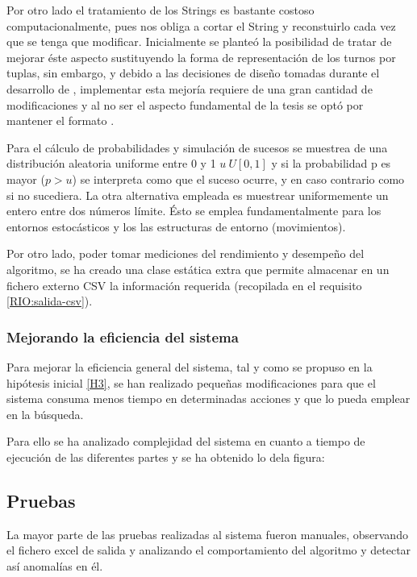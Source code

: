 Por otro lado el tratamiento de los Strings es bastante costoso computacionalmente, pues nos obliga a cortar el String y reconstuirlo cada vez que se tenga que modificar. Inicialmente se planteó la posibilidad de tratar de mejorar éste aspecto sustituyendo la forma de representación de los turnos por tuplas, sin embargo, y debido a las decisiones de diseño tomadas durante el desarrollo de \legacy{}, implementar esta mejoría requiere de una gran cantidad de modificaciones y al no ser el aspecto fundamental de la tesis se optó por mantener el formato \legacy{}.

Para el cálculo de probabilidades y simulación de sucesos se muestrea de una distribución aleatoria uniforme entre 0 y 1 $u ~ U[0,1]$ y si la probabilidad p es mayor ($p>u$) se interpreta como que el suceso ocurre, y en caso contrario como si no sucediera. 
La otra alternativa empleada es muestrear uniformemente un entero entre dos números límite. 
Ésto se emplea fundamentalmente para los entornos estocásticos y los las estructuras de entorno (movimientos).

Por otro lado, poder tomar mediciones del rendimiento y desempeño del algoritmo, se ha creado una clase estática extra que permite almacenar en un fichero externo CSV la información requerida (recopilada en el requisito \ref{RIO:salida-csv}).

\subsubsection{Mejorando la eficiencia del sistema}
\label{sec:4:mejorando-eficiencia}

Para mejorar la eficiencia general del sistema, tal y como se propuso en la hipótesis inicial \ref{H3}, se han realizado pequeñas modificaciones para que el sistema consuma menos tiempo en determinadas acciones y que lo pueda emplear en la búsqueda.

Para ello se ha analizado complejidad del sistema en cuanto a tiempo de ejecución de las diferentes partes y se ha obtenido lo dela figura:  %


\subsection{Pruebas}
\label{sec:4:tests}

La mayor parte de las pruebas realizadas al sistema fueron manuales, observando el fichero excel de salida y analizando el comportamiento del algoritmo y detectar así anomalías en él.

